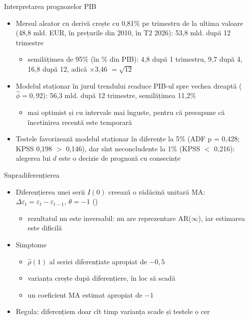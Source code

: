 \begin{frame}{Interpretarea prognozelor PIB}
\itemsize{\small}
\begin{itemize}
    \item Mersul aleator cu derivă crește cu 0{,}81\% pe trimestru de la ultima valoare (48{,}8 mld. EUR, în prețurile din 2010, în T2 2026): 53{,}8 mld. după 12 trimestre
    \begin{itemize}
        \item semilățimea de 95\% (în \% din PIB): 4{,}8 după 1 trimestru, 9{,}7 după 4, 16{,}8 după 12, adică $\times$3{,}46 $= \sqrt{12}$
    \end{itemize}
    \item Modelul staționar în jurul trendului readuce PIB-ul spre vechea dreaptă ($\hat\phi = 0{,}92$): 56{,}3 mld. după 12 trimestre, semilățimea 11{,}2\%
    \begin{itemize}
        \item mai optimist și cu intervale mai înguste, pentru că presupune că încetinirea recentă este temporară
    \end{itemize}
    \item Testele favorizează modelul staționar în diferențe la 5\% (ADF p = 0{,}428; KPSS 0{,}198 $>$ 0,146), dar sînt neconcludente la 1\% (KPSS $<$ 0,216): alegerea lui $d$ este o decizie de prognoză cu consecințe
\end{itemize}
\end{frame}

\begin{frame}{Supradiferențierea}
\itemsize{\small}
\begin{itemize}
    \item Diferențierea unei serii $I(0)$ creează o rădăcină unitară MA: $\Delta\varepsilon_t = \varepsilon_t - \varepsilon_{t-1}$, $\theta = -1$ ()
    \begin{itemize}
        \item rezultatul nu este inversabil: nu are reprezentare AR($\infty$), iar estimarea este dificilă 
    \end{itemize}
    \item Simptome
    \begin{itemize}
        \item $\hat\rho(1)$ al seriei diferențiate apropiat de $-0{,}5$
        \item varianța crește după diferențiere, în loc să scadă
        \item un coeficient MA estimat apropiat de $-1$
    \end{itemize}
    \item Regula: diferențiem doar cît timp varianța scade și testele o cer
\end{itemize}
\end{frame}


